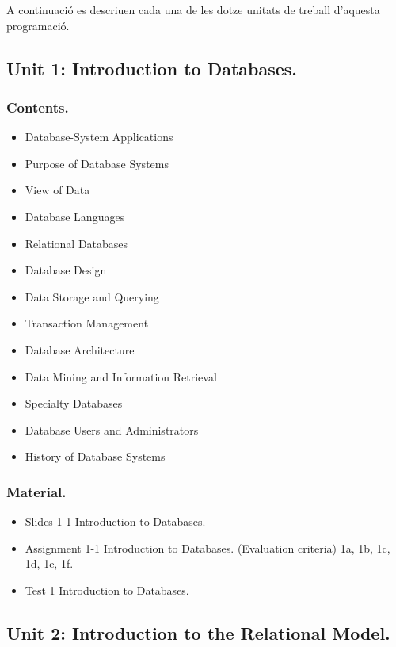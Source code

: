\documentclass[catalan, a4paper, 12pt, titlepage]{article}
\begin{document}
A continuació es descriuen cada una de les dotze unitats de treball d'aquesta programació.

  \subsection{Unit 1: Introduction to Databases.}
  
  \subsubsection{Contents.}

  \begin{itemize}
	  \item Database-System Applications
	  \item Purpose of Database Systems
	  \item View of Data
	  \item Database Languages
	  \item Relational Databases
	  \item Database Design
	  \item Data Storage and Querying
	  \item Transaction Management
	  \item Database Architecture
	  \item Data Mining and Information Retrieval
	  \item Specialty Databases
	  \item Database Users and Administrators
	  \item History of Database Systems
  \end{itemize}
  
  \subsubsection{Material.}

  \begin{itemize}
          \item Slides 1-1 Introduction to Databases.
	  \item Assignment 1-1 Introduction to Databases.
		  (\faGraduationCap Evaluation criteria) 1a, 1b, 1c, 1d, 1e, 1f.
	  \item Test 1 Introduction to Databases.
  \end{itemize}

  \subsection{Unit 2: Introduction to the Relational Model.}
\end{document}
